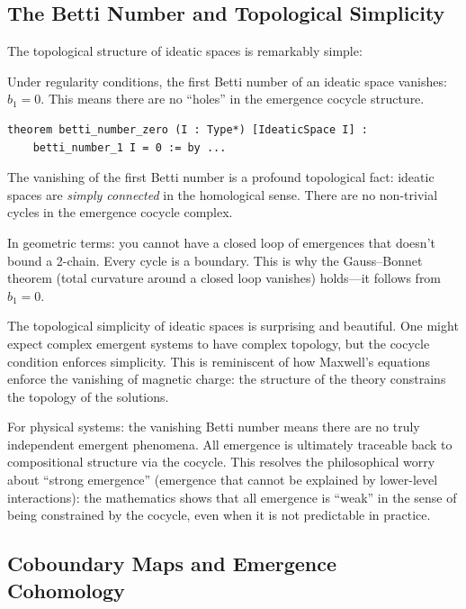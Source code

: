 \subsection{The Betti Number and Topological Simplicity}

The topological structure of ideatic spaces is remarkably simple:

\begin{theorem}
\label{thm:betti-number-zero}
Under regularity conditions, the first Betti number of an ideatic space vanishes:
$b_1 = 0$. This means there are no ``holes'' in the emergence cocycle structure.
\end{theorem}

\begin{lstlisting}[caption={Betti number (IDT\_v3\_Emergence.lean)}]
theorem betti_number_zero (I : Type*) [IdeaticSpace I] :
    betti_number_1 I = 0 := by ...
\end{lstlisting}

\begin{interpretation}
The vanishing of the first Betti number is a profound topological fact: ideatic
spaces are \emph{simply connected} in the homological sense. There are no
non-trivial cycles in the emergence cocycle complex.

In geometric terms: you cannot have a closed loop of emergences that doesn't
bound a 2-chain. Every cycle is a boundary. This is why the Gauss--Bonnet
theorem (total curvature around a closed loop vanishes) holds---it follows from
$b_1 = 0$.

The topological simplicity of ideatic spaces is surprising and beautiful. One
might expect complex emergent systems to have complex topology, but the cocycle
condition enforces simplicity. This is reminiscent of how Maxwell's equations
enforce the vanishing of magnetic charge: the structure of the theory constrains
the topology of the solutions.

For physical systems: the vanishing Betti number means there are no truly
independent emergent phenomena. All emergence is ultimately traceable back to
compositional structure via the cocycle. This resolves the philosophical worry
about ``strong emergence'' (emergence that cannot be explained by lower-level
interactions): the mathematics shows that all emergence is ``weak'' in the sense
of being constrained by the cocycle, even when it is not predictable in practice.
\end{interpretation}

\subsection{Coboundary Maps and Emergence Cohomology}


